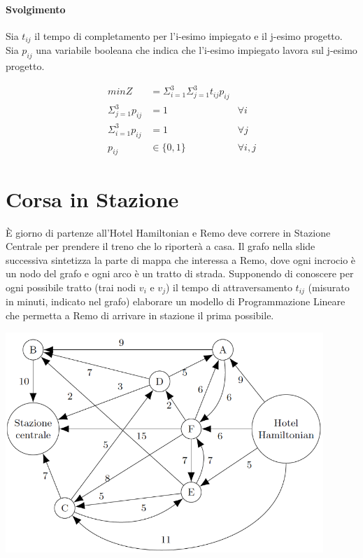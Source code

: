 \paragraph{Svolgimento}

Sia $t_{ij}$ il tempo di completamento per l'i-esimo impiegato e il j-esimo progetto.
Sia $p_{ij}$ una variabile booleana che indica che l'i-esimo impiegato lavora sul j-esimo progetto.

\begin{align*}
    min Z &= \Sigma ^{3} _{i=1} \Sigma ^{3} _{j=1} t_{ij} p_{ij} \\
    \Sigma ^{3} _{j=1} p_{ij} &= 1 &\forall i\\
    \Sigma ^{3} _{i=1} p_{ij} &= 1 &\forall j\\
    p_{ij} &\in \{0,1\} &\forall i,j 
\end{align*}

\section{Corsa in Stazione}

È giorno di partenze all’Hotel Hamiltonian e Remo deve correre in Stazione Centrale per prendere il treno che lo riporterà a casa. Il grafo nella slide successiva sintetizza la parte di mappa che interessa a Remo, dove ogni incrocio è un nodo del grafo e ogni arco è un tratto di strada. Supponendo di conoscere per ogni possibile tratto (trai nodi $v_i$ e $v_j$) il tempo di attraversamento $t_{ij}$ (misurato in minuti, indicato nel grafo) elaborare un modello di Programmazione Lineare che permetta a Remo di arrivare in stazione il prima possibile.

\begin{center}
    \includegraphics[width=12cm]{images/esercitazione/programmazione-lineare-mista/CorsaInStazione.png}
\end{center}

